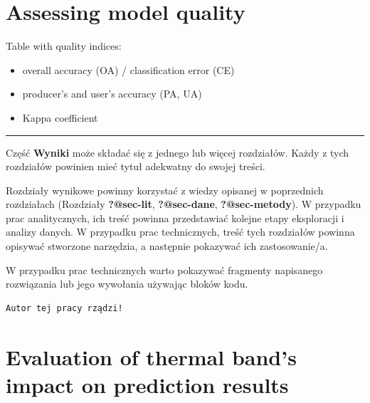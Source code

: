 \documentclass{amuthesis}
\begin{document}

\hypertarget{sec-results-eval}{%
\chapter{Assessing model quality}\label{sec-results-eval}}

Table with quality indices:

\begin{itemize}
\item
  overall accuracy (OA) / classification error (CE)
\item
  producer's and user's accuracy (PA, UA)
\item
  Kappa coefficient
\end{itemize}

\begin{center}\rule{0.5\linewidth}{0.5pt}\end{center}

Część \textbf{Wyniki} może składać się z jednego lub więcej rozdziałów.
Każdy z tych rozdziałów powinien mieć tytuł adekwatny do swojej treści.

Rozdziały wynikowe powinny korzystać z wiedzy opisanej w poprzednich
rozdziałach (Rozdziały \textbf{?@sec-lit}, \textbf{?@sec-dane},
\textbf{?@sec-metody}). W przypadku prac analitycznych, ich treść
powinna przedstawiać kolejne etapy eksploracji i analizy danych. W
przypadku prac technicznych, treść tych rozdziałów powinna opisywać
stworzone narzędzia, a następnie pokazywać ich zastosowanie/a.

W przypadku prac technicznych warto pokazywać fragmenty napisanego
rozwiązania lub jego wywołania używając bloków kodu.

\begin{Shaded}
\begin{Highlighting}[]
\OtherTok{=} 
  \NormalTok{)}
\NormalTok{\}}
\NormalTok{(}\NormalTok{)}
\end{Highlighting}
\end{Shaded}

\begin{verbatim}
Autor tej pracy rządzi!
\end{verbatim}


\hypertarget{sec-results-therm}{%
\chapter{Evaluation of thermal band's impact on prediction
results}\label{sec-results-therm}}
\end{document}
